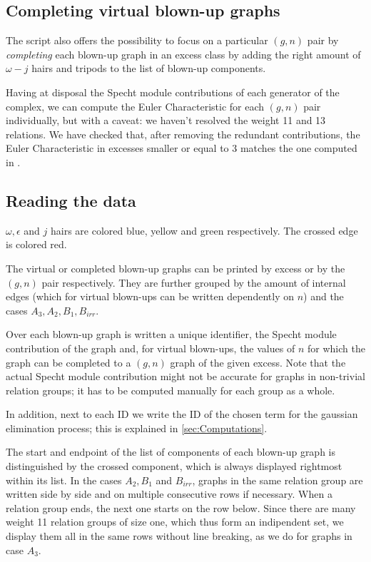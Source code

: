 \subsection{Completing virtual blown-up graphs} The script also offers the possibility to focus on a particular $(g,n)$ pair by \textit{completing} each blown-up graph in an excess class by adding the right amount of $\omega-j$ hairs and tripods to the list of blown-up components.

Having at disposal the Specht module contributions of each generator of the complex, we can compute the Euler Characteristic for each $(g,n)$ pair individually, but with a caveat: we haven't resolved the weight 11 and 13 relations. We have checked that, after removing the redundant contributions, the Euler Characteristic in excesses smaller or equal to 3 matches the one computed in \cite[Figure 1]{CLPW}.

\subsection{Reading the data} $\omega,\epsilon$ and $j$ hairs are colored blue, yellow and green respectively. The crossed edge is colored red.

The virtual or completed blown-up graphs can be printed by excess or by the $(g,n)$ pair respectively. They are further grouped by the amount of internal edges (which for virtual blown-ups can be written dependently on $n$) and the cases $A_3,A_2,B_1,B_{irr}$.

Over each blown-up graph is written a unique identifier, the Specht module contribution of the graph and, for virtual blown-ups, the values of $n$ for which the graph can be completed to a $(g,n)$ graph of the given excess. Note that the actual Specht module contribution might not be accurate for graphs in non-trivial relation groups; it has to be computed manually for each group as a whole.

In addition, next to each ID we write the ID of the chosen term for the gaussian elimination process; this is explained in \ref{sec:Computations}.

The start and endpoint of the list of components of each blown-up graph is distinguished by the crossed component, which is always displayed rightmost within its list. In the cases $A_2, B_1$ and $B_{irr}$, graphs in the same relation group are written side by side and on multiple consecutive rows if necessary. When a relation group ends, the next one starts on the row below. Since there are many weight 11 relation groups of size one, which thus form an indipendent set, we display them all in the same rows without line breaking, as we do for graphs in case $A_3$.